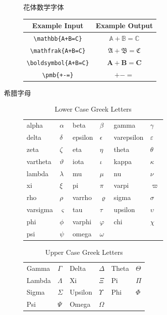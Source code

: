 \begin{description}
\begin{table}[htbp]
\begin{tabular}{cc}
\hline 
\end{tabular} 
\end{table}
花体数学字体
\begin{table}
\centering
\begin{tabular}{cc}
\hline
Example Input  & Example Output \\ 
\hline
\verb$\mathbb{A+B=C}$  & $\mathbb{A+B=C}$ \\ 
\verb$\mathfrak{A+B=C}$  & $\mathfrak{A+B=C}$ \\ 
\verb$\boldsymbol{A+B=C}$  & $\boldsymbol{A+B=C}$ \\ 
\verb$\pmb{+-=}$ &    $\pmb{+-=}$\\ 
\hline 
\end{tabular} 
\end{table}
\item[希腊字母]

\begin{table}[htbp]
\caption{Lower Case Greek Letters}
\label{tab:greek}
\centering
\begin{tabular}{llllll}
{alpha} & $\alpha$ &
{beta} & $\beta$ &
{gamma} & $\gamma$ \\
{delta} & $\delta$  &
{epsilon} & $\epsilon$ &
{varepsilon} & $\varepsilon$\\
{zeta} & $\zeta$ &
{eta} & $\eta$ &
{theta} & $\theta$ \\
{vartheta} & $\vartheta$ &
{iota} & $\iota$ & 
{kappa} & $\kappa$ \\
{lambda} & $\lambda$ &
{mu} & $\mu$ &
{nu} & $\nu$ \\
{xi} & $\xi$ &
{pi} & $\pi$ &
{varpi} & $\varpi$\\
{rho} & $\rho$ &
{varrho} & $\varrho$ &
{sigma} & $\sigma$ \\
{varsigma} & $\varsigma$ &
{tau} & $\tau$ &
{upsilon} & $\upsilon$ \\
{phi} & $\phi$ &
{varphi} & $\varphi$ &
{chi} & $\chi$ \\
{psi} & $\psi$ &
{omega} & $\omega$ 
\end{tabular}
\end{table}

\begin{table}[htbp]
\caption{Upper Case Greek Letters}
\label{tab:Greek}
\centering
\begin{tabular}{llllll}
{Gamma} & $\Gamma$ &
{Delta} & $\Delta$ &
{Theta} & $\Theta$ \\
{Lambda} & $\Lambda$ &
{Xi} & $\Xi$ &
{Pi} & $\Pi$ \\
{Sigma} & $\Sigma$ &
{Upsilon} & $\Upsilon$ &
{Phi} & $\Phi$ \\
{Psi} & $\Psi$ &
{Omega} & $\Omega$
\end{tabular}
\end{table}


\end{description}







